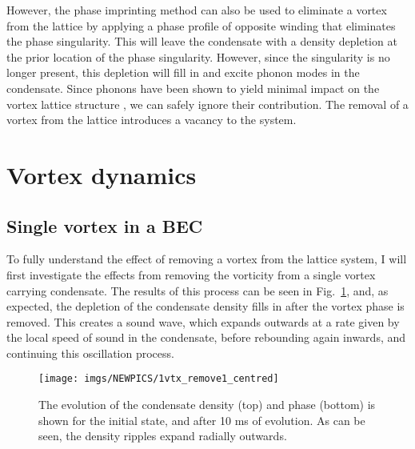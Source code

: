 However, the phase imprinting method can also be used to eliminate a vortex from the lattice by applying a phase profile of opposite winding that eliminates the phase singularity.  This will leave the condensate with a density depletion at the prior location of the phase singularity. However, since the singularity is no longer present, this depletion will fill in and excite phonon modes in the condensate. Since phonons have been shown to yield minimal impact on the vortex lattice structure \cite{VTX:Oriordan_pra_2016}, we can safely ignore their contribution. The removal of a vortex from the lattice introduces a vacancy to the system.







\section{Vortex dynamics}\label{sec:vtxdyn}
\subsection{Single vortex in a BEC}
To fully understand the effect of removing a vortex from the lattice system, I will first investigate the effects from removing the vorticity from a single vortex carrying condensate. The results of this process can be seen in Fig.~\ref{fig:annihilation_1vtx}, and, as expected, the depletion of the condensate density fills in after the vortex phase is removed. This creates a sound wave, which expands outwards at a rate given by the local speed of sound in the condensate, before rebounding again inwards, and continuing this oscillation process.
\begin{figure}
    \texttt{[image: imgs/NEWPICS/1vtx\_remove1\_centred]}

    \caption{The evolution of the condensate density (top) and phase (bottom) is shown for the initial state, and after 10 ms of evolution. As can be seen, the density ripples expand radially outwards. }\label{fig:annihilation_1vtx}
\end{figure}

